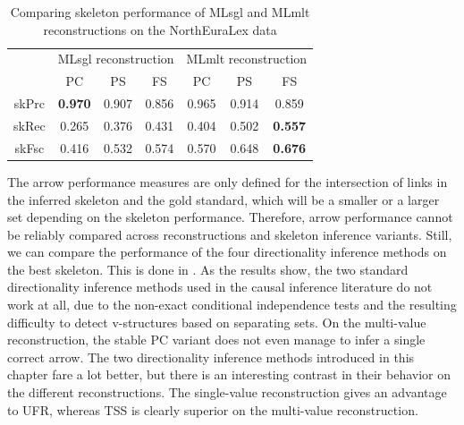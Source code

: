 \begin{table}
 \centering
 \begin{tabular}{ccccccc}
  \hline \hline
   & \multicolumn{3}{l}{MLsgl reconstruction} & \multicolumn{3}{l}{MLmlt reconstruction}\\ 
   & PC & PS & FS & PC & PS & FS\\ \hline
  skPrc & \textbf{0.970} & 0.907 & 0.856 & 0.965 & 0.914 & 0.859\\
  skRec & 0.265 & 0.376 & 0.431 & 0.404 & 0.502 & \textbf{0.557}\\
  skFsc & 0.416 & 0.532 & 0.574 & 0.570 & 0.648 & \textbf{0.676}\\
  \hline
 \end{tabular}
 \caption{Comparing skeleton performance of MLsgl and MLmlt reconstructions on the NorthEuraLex data}
 \label{skeleton-evaluation-nelex}
\end{table}

The arrow performance measures are only defined for the intersection of links in the inferred skeleton and the gold standard, which will be a smaller or a larger set depending on the skeleton performance. Therefore, arrow performance cannot be reliably compared across reconstructions and skeleton inference variants. Still, we can compare the performance of the four directionality inference methods on the best skeleton. This is done in . As the results show, the two standard directionality inference methods used in the causal inference literature do not work at all, due to the non-exact conditional independence tests and the resulting difficulty to detect v-structures based on separating sets. On the multi-value reconstruction, the stable PC variant does not even manage to infer a single correct arrow. The two directionality inference methods introduced in this chapter fare a lot better, but there is an interesting contrast in their behavior on the different reconstructions. 
The single-value reconstruction gives an advantage to UFR, whereas TSS is clearly superior on the multi-value reconstruction.

